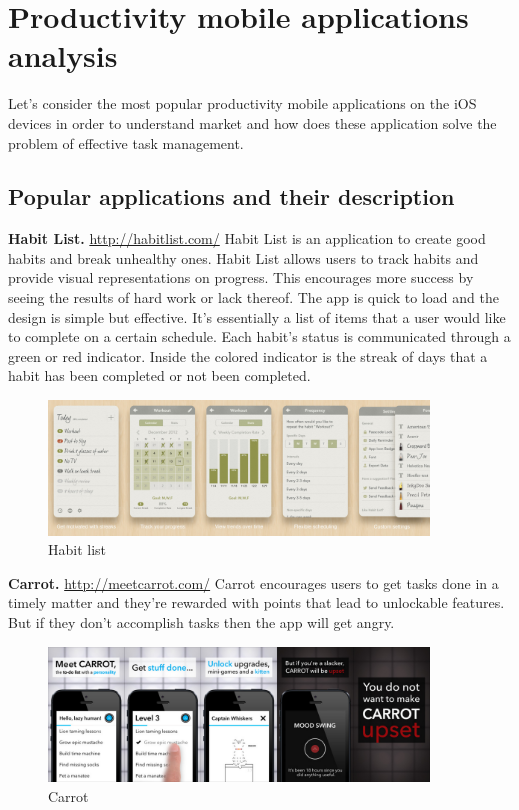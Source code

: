 \chapter{Productivity mobile applications analysis}
\label{chap:apps}
Let's consider the most popular productivity mobile applications on the iOS devices in order to understand market and how does these application solve the problem of effective task management.

\section{Popular applications and their description}

\textbf{Habit List.} \url{http://habitlist.com/} Habit List is an application to create good habits and break unhealthy ones. Habit List allows users to track habits and provide visual representations on progress. This encourages more success by seeing the results of hard work or lack thereof. The app is quick to load and the design is simple but effective. It’s essentially a list of items that a user would like to complete on a certain schedule. Each habit’s status is communicated through a green or red indicator. Inside the colored indicator is the streak of days that a habit has been completed or not been completed.

\begin{figure}
   \centering
	\includegraphics[width=0.9\textwidth]{resources/habit-list.pdf}
	\caption[Habit List]{Habit list}
\end{figure}

\textbf{Carrot.} \url{http://meetcarrot.com/} Carrot encourages users to get tasks done in a timely matter and they're rewarded with points that lead to unlockable features. But if they don't accomplish tasks then the app will get angry.

\begin{figure}
   \centering
	\includegraphics[width=0.9\textwidth]{resources/carrot.pdf}
	\caption[Carrot]{Carrot}
\end{figure}

